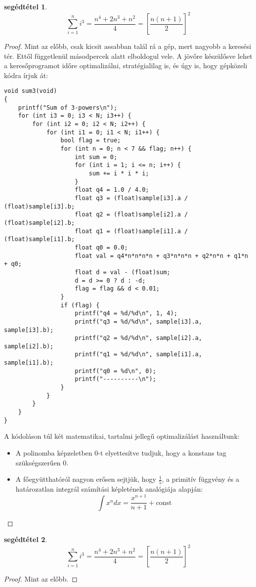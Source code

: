 \documentclass{article}
\newtheorem{lemm}{segédtétel}
\newcommand{\squareparenthesed}[1]{\left[#1\right]}
\newcommand{\parenthesed}[1]{\left(#1\right)}
\begin{document}
	\begin{lemm}
		\[
			\sum_{i=1}^n i^3 = \frac{n^4+2n^3+n^2}4 = \squareparenthesed{\frac{n\parenthesed{n+1}}2}^2
		\]
	\end{lemm}
	\begin{proof}
		Mint az előbb, csak kicsit assabban talál rá a gép, mert nagyobb a keresési tér.
		Ettől függetlenül másodpercek alatt elboldogul vele.
		A jövőre készülősve lehet a keresőprogramot időre optimalizálni, stratégialilag is, és úgy is, hogy gépközeli kódra írjuk át:
		\begin{verbatim}
void sum3(void)
{
	printf("Sum of 3-powers\n");
	for (int i3 = 0; i3 < N; i3++) {
		for (int i2 = 0; i2 < N; i2++) {
			for (int i1 = 0; i1 < N; i1++) {
				bool flag = true;
				for (int n = 0; n < 7 && flag; n++) {
					int sum = 0;
					for (int i = 1; i <= n; i++) {
						sum += i * i * i;
					}
					float q4 = 1.0 / 4.0;
					float q3 = (float)sample[i3].a / (float)sample[i3].b;
					float q2 = (float)sample[i2].a / (float)sample[i2].b;
					float q1 = (float)sample[i1].a / (float)sample[i1].b;
					float q0 = 0.0;
					float val = q4*n*n*n*n + q3*n*n*n + q2*n*n + q1*n + q0;
					float d = val - (float)sum;
					d = d >= 0 ? d : -d;
					flag = flag && d < 0.01;
				}
				if (flag) {
					printf("q4 = %d/%d\n", 1, 4);
					printf("q3 = %d/%d\n", sample[i3].a, sample[i3].b);
					printf("q2 = %d/%d\n", sample[i2].a, sample[i2].b);
					printf("q1 = %d/%d\n", sample[i1].a, sample[i1].b);
					printf("q0 = %d\n", 0);
					printf("----------\n");
				}
			}
		}
	}
}
		\end{verbatim}
		A kódoláson túl két matematikai, tartalmi jellegű optimalizálást használtunk:
		\begin{itemize}
			\item A polinomba képzeletben 0-t elyettesítve tudjuk, hogy a konstans tag szükségszerűen 0.
			\item A főegyütthatóról nagyon erősen sejtjük, hogy $\frac15$, a primitív függvény és a határozatlan integrál számítási képletének analógiája alapján:
			\[\int x^n dx = \frac{x^{n+1}}{n+1} + \text{const}\]
		\end{itemize}
	\end{proof}

	\begin{lemm}
		\[
			\sum_{i=1}^n i^3 = \frac{n^4+2n^3+n^2}4 = \squareparenthesed{\frac{n\parenthesed{n+1}}2}^2
		\]
	\end{lemm}
	\begin{proof}
		Mint az előbb.
	\end{proof}
\end{document}
